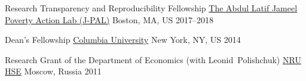 



\begin{cvhonors}

  \cvhonor
    {Research Transparency and Reproducibility Fellowship} %
    {\href{https://www.povertyactionlab.org/rt}{The Abdul Latif Jameel Poverty Action Lab (J-PAL)}} %
    {Boston, MA, US} %
    {2017--2018} %

  \cvhonor
    {Dean's Fellowship} %
    {\href{http://www.columbia.edu/}{Columbia University}} %
    {New York, NY, US} %
    {2014} %

  \cvhonor
    {Research Grant of the Department of Economics (with Leonid~Polishchuk)} %
    {\href{http://www.hse.ru/en/}{NRU HSE}} %
    {Moscow, Russia} %
    {2011} %

\end{cvhonors}






